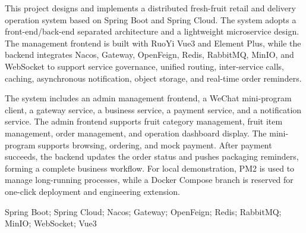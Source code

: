 {\rmfamily{}\setlength{\parindent}{2em}\linespread{1.45}\selectfont
This project designs and implements a distributed fresh-fruit retail and delivery operation system based on Spring Boot and Spring Cloud. The system adopts a front-end/back-end separated architecture and a lightweight microservice design. The management frontend is built with RuoYi Vue3 and Element Plus, while the backend integrates Nacos, Gateway, OpenFeign, Redis, RabbitMQ, MinIO, and WebSocket to support service governance, unified routing, inter-service calls, caching, asynchronous notification, object storage, and real-time order reminders.

The system includes an admin management frontend, a WeChat mini-program client, a gateway service, a business service, a payment service, and a notification service. The admin frontend supports fruit category management, fruit item management, order management, and operation dashboard display. The mini-program supports browsing, ordering, and mock payment. After payment succeeds, the backend updates the order status and pushes packaging reminders, forming a complete business workflow. For local demonstration, PM2 is used to manage long-running processes, while a Docker Compose branch is reserved for one-click deployment and engineering extension.

\vspace{0.45cm}
 Spring Boot; Spring Cloud; Nacos; Gateway; OpenFeign; Redis; RabbitMQ; MinIO; WebSocket; Vue3
\par}
